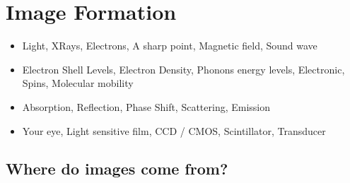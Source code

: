 \documentclass[letterpaper,10pt,english]{sphinxmanual}
\begin{document}
\noindent{}


\chapter{Image Formation}
\label{\detokenize{01-Introduction:image-formation}}
\sphinxAtStartPar
{}
\begin{itemize}
\item {} 
\sphinxAtStartPar
{} Light, X\sphinxhyphen{}Rays, Electrons, A sharp point, Magnetic field, Sound wave

\item {} 
\sphinxAtStartPar
{} Electron Shell Levels, Electron Density, Phonons energy levels, Electronic, Spins, Molecular mobility

\item {} 
\sphinxAtStartPar
{} Absorption, Reflection, Phase Shift, Scattering, Emission

\item {} 
\sphinxAtStartPar
{} Your eye, Light sensitive film, CCD / CMOS, Scintillator, Transducer

\end{itemize}


\section{Where do images come from?}
\label{\detokenize{01-Introduction:where-do-images-come-from}}
\end{document}
